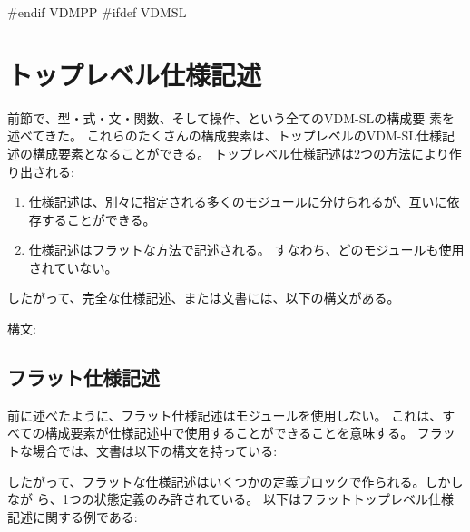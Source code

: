 \documentclass[\pformat,12pt]{jarticle}
\begin{document}
#endif VDMPP
#ifdef VDMSL
\newpage
\section{トップレベル仕様記述}
\label{top-level}\label{modules}

前節で、型・式・文・関数、そして操作、という全てのVDM-SLの構成要
素を述べてきた。
これらのたくさんの構成要素は、トップレベルのVDM-SL仕様記述の構成要素となることができる。
トップレベル仕様記述は2つの方法により作り出される:
\begin{enumerate}
\item 仕様記述は、別々に指定される多くのモジュールに分けられるが、互いに依存することができる。
\item 仕様記述はフラットな方法で記述される。 すなわち、どのモジュールも使用されていない。
\end{enumerate}
したがって、完全な仕様記述、または文書には、以下の構文がある。

\begin{description}
\item[構文:]

\end{description}

\subsection{フラット仕様記述}\label{flat}

前に述べたように、フラット仕様記述はモジュールを使用しない。
これは、すべての構成要素が仕様記述中で使用することができることを意味する。 
フラットな場合では、文書は以下の構文を持っている:



したがって、フラットな仕様記述はいくつかの定義ブロックで作られる。しかしなが
ら、1つの状態定義のみ許されている。
以下はフラットトップレベル仕様記述に関する例である:
\end{document}
